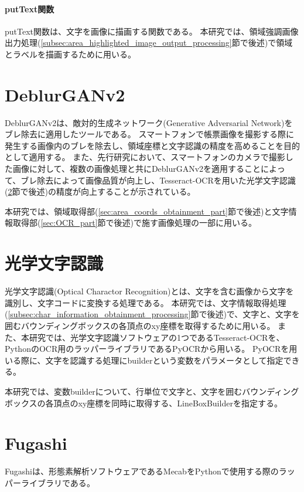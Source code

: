 \paragraph{putText関数}
putText関数は、文字を画像に描画する関数である。
本研究では、領域強調画像出力処理(\ref{subsec:area_highlighted_image_output_processing}節で後述)で領域とラベルを描画するために用いる。

\section{DeblurGANv2}\label{sec:DeblurGANv2}
DeblurGANv2は、敵対的生成ネットワーク(Generative Adversarial Network)をブレ除去に適用したツールである\cite{DeblurGANv2}。
スマートフォンで帳票画像を撮影する際に発生する画像内のブレを除去し、領域座標と文字認識の精度を高めることを目的として適用する。
また、先行研究において、スマートフォンのカメラで撮影した画像に対して、複数の画像処理と共にDeblurGANv2を適用することによって、ブレ除去によって画像品質が向上し、Tesseract-OCR\cite{Tesseract-OCR}を用いた光学文字認識(\ref{sec:Optical-Charactor-Recognition}節で後述)の精度が向上することが示されている\cite{DeblurGANv2の先行研究}。

本研究では、領域取得部(\ref{sec:area_coords_obtainment_part}節で後述)と文字情報取得部(\ref{sec:OCR_part}節で後述)で施す画像処理の一部に用いる。


\section{光学文字認識}\label{sec:Optical-Charactor-Recognition}
光学文字認識(Optical Charactor Recognition)とは、文字を含む画像から文字を識別し、文字コードに変換する処理である\cite{光学文字認識}。
本研究では、文字情報取得処理(\ref{subsec:char_information_obtainment_processing}節で後述)で、文字と、文字を囲むバウンディングボックスの各頂点のxy座標を取得するために用いる。
また、本研究では、光学文字認識ソフトウェア\cite{光学文字認識ソフトウェア}の1つであるTesseract-OCRを、Python\cite{Python}のOCR用のラッパーライブラリであるPyOCR\cite{PyOCR}から用いる。
PyOCRを用いる際に、文字を認識する処理にbuilderという変数をパラメータとして指定できる。

本研究では、変数builderについて、行単位で文字と、文字を囲むバウンディングボックスの各頂点のxy座標を同時に取得する、LineBoxBuilderを指定する。

\section{Fugashi}\label{sec:Fugashi}
Fugashiは、形態素解析ソフトウェアであるMecab\cite{Mecab}をPythonで使用する際のラッパーライブラリである\cite{Fugashi}。

